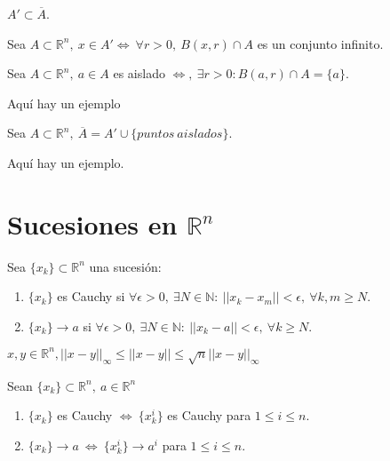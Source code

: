 \begin{obs}
$A' \subset \overline{A}$.
\end{obs}

\begin{prop}
Sea $A \subset \mathbb{R}^n, \ x \in A' \Leftrightarrow \ \forall r > 0, \ B(x,r)\cap A$ es un conjunto infinito.
\end{prop}

\begin{defn}
Sea $A \subset \mathbb{R}^n, \ a \in A$ es aislado $\Leftrightarrow, \ \exists r > 0 : B(a,r)\cap A = \{a\}.$
\end{defn}

\begin{ejm}
Aquí hay un ejemplo
\end{ejm}

\begin{prop}
Sea $A \subset \mathbb{R}^n,  \ \overline{A} = A' \cup \{puntos \ aislados\} $.
\end{prop}

\begin{ejm}
Aquí hay un ejemplo.
\end{ejm}


\section{Sucesiones en $\mathbb{R}^n$}
\begin{defn}
Sea $\{ x_k \} \subset \mathbb{R}^n$ una sucesión:

\begin{enumerate}[label=(\roman*)]
    \item $\{ x_k \}$ es Cauchy si $ \forall \epsilon > 0, \ \exists N \in \mathbb{N}: \ || x_k - x_m || < \epsilon, \ \forall k,m \geq N$.
    \item  $\{ x_k \} \rightarrow a$ si $\forall \epsilon > 0, \ \exists N \in \mathbb{N}: \ || x_k - a || < \epsilon, \ \forall k \geq N$.
\end{enumerate}
\end{defn}

\begin{obs}
$ x,y \in \mathbb{R}^n, || x - y ||_\infty \leq || x - y || \leq \sqrt{n}|| x -y ||_\infty $
\end{obs}

\begin{prop}
Sean $\{ x_k \} \subset \mathbb{R}^n, \ a \in \mathbb{R}^n $

\begin{enumerate}[label=(\roman*)]
    \item $\{ x_k \}$ es Cauchy $\Leftrightarrow \ \{ x^i_k \}$ es Cauchy para $1 \leq i \leq n$.
    \item $\{ x_k \} \rightarrow a \ \Leftrightarrow \ \{ x^i_k \} \rightarrow a^i$ para $1 \leq i \leq n$.
\end{enumerate}
\end{prop}

